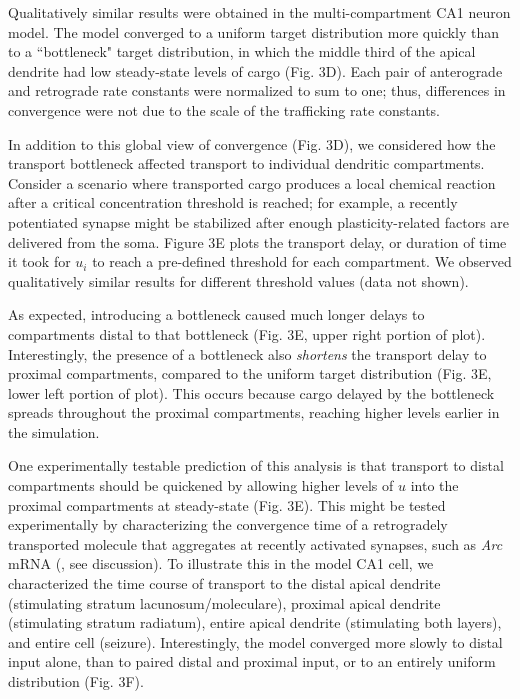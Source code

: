 \documentclass[10pt]{wlpeerj}
\begin{document}
Qualitatively similar results were obtained in the multi-compartment CA1 neuron model.
The model converged to a uniform target distribution more quickly than to a ``bottleneck" target distribution, in which the middle third of the apical dendrite had low steady-state levels of cargo (Fig. 3D).
Each pair of anterograde and retrograde rate constants were normalized to sum to one; thus, differences in convergence were not due to the scale of the trafficking rate constants.

In addition to this global view of convergence (Fig. 3D), we considered how the transport bottleneck affected transport to individual dendritic compartments.
Consider a scenario where transported cargo produces a local chemical reaction after a critical concentration threshold is reached; for example, a recently potentiated synapse might be stabilized after enough plasticity-related factors are delivered from the soma.
Figure 3E plots the transport delay, or duration of time it took for $u_i$ to reach a pre-defined threshold for each compartment. We observed qualitatively similar results for different threshold values (data not shown).

As expected, introducing a bottleneck caused much longer delays to compartments distal to that bottleneck (Fig. 3E, upper right portion of plot). Interestingly, the presence of a bottleneck also \textit{shortens} the transport delay to proximal compartments, compared to the uniform target distribution (Fig. 3E, lower left portion of plot). This occurs because cargo delayed by the bottleneck spreads throughout the proximal compartments, reaching higher levels earlier in the simulation.

One experimentally testable prediction of this analysis is that transport to distal compartments should be quickened by allowing higher levels of $u$ into the proximal compartments at steady-state (Fig. 3E).
This might be tested experimentally by characterizing the convergence time of a retrogradely transported molecule that aggregates at recently activated synapses, such as \textit{Arc} mRNA (\citet{Steward_1998}, see discussion).
To illustrate this in the model CA1 cell, we characterized the time course of transport to the distal apical dendrite (stimulating stratum lacunosum/moleculare), proximal apical dendrite (stimulating stratum radiatum), entire apical dendrite (stimulating both layers), and entire cell (seizure). Interestingly, the model converged more slowly to distal input alone, than to paired distal and proximal input, or to an entirely uniform distribution (Fig. 3F).
\end{document}
